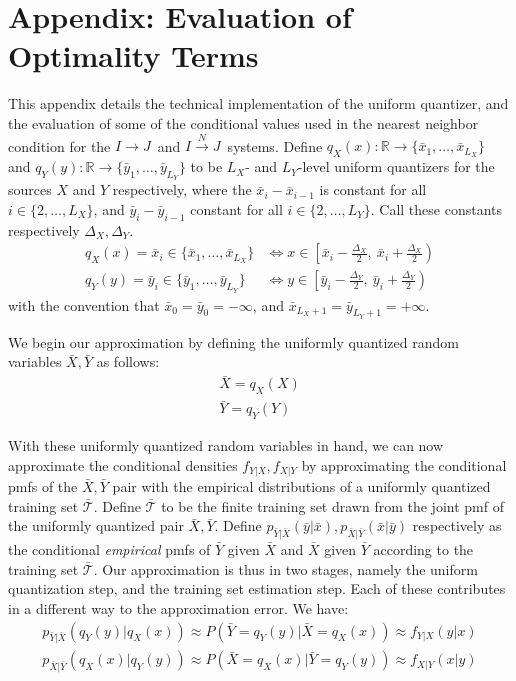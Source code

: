 \documentclass[10pt,twoside,titlepage]{article}
\newcommand{\sysIJN}{\mbox{$I \overset{N}{\rightarrow} J$}}
\newcommand{\sysIJ}{\mbox{$I \rightarrow J$}}
\begin{document}
\nocite{*}

\section{Appendix:  Evaluation of Optimality Terms}
This appendix details the technical implementation of the uniform quantizer, and the evaluation of some of the conditional values used in the nearest neighbor condition for the \sysIJ\ and \sysIJN\ systems.
Define
$q_X(x):\mathbb{R} \rightarrow \{\bar x_1,\ldots,\bar x_{L_X}\}$
and
$q_Y(y):\mathbb{R} \rightarrow \{\bar y_1,\ldots,\bar y_{L_Y}\}$
to be $L_X$- and $L_Y$-level uniform quantizers for the sources $X$ and $Y$ respectively, where the $\bar x_i-\bar x_{i-1}$ is constant for all $i\in \{2,\ldots,L_X\}$, and $\bar y_i-\bar y_{i-1}$ constant for all $i\in \{2,\ldots,L_Y\}$. Call these constants respectively $\Delta_X, \Delta_Y$.
\begin{align}
    q_X(x) = \bar x_i \in \{\bar x_1,\ldots,\bar x_{L_X}\} &\iff x \in  \left[\bar x_{i}-\frac{\Delta_X}{2},\ \bar x_i+\frac{\Delta_X}{2}\right)\\
    q_Y(y) = \bar y_i \in \{\bar y_1,\ldots,\bar y_{L_Y}\} &\iff y \in  \left[\bar y_{i}-\frac{\Delta_Y}{2},\ \bar y_i+\frac{\Delta_Y}{2}\right)
\end{align}
with the convention that $\bar x_{0}=\bar y_{0}=-\infty$, and $\bar x_{L_X+1}=\bar y_{L_Y+1}=+\infty$.

We begin our approximation by defining the uniformly quantized random variables $\bar X, \bar Y$ as follows:
\begin{align}
    \bar X = q_X(X)\\
    \bar Y = q_Y(Y)
\end{align}

With these uniformly quantized random variables in hand, we can now approximate the conditional densities $f_{Y|X}, f_{X|Y}$ by approximating the conditional pmfs of the $\bar X, \bar Y$ pair with the empirical distributions of a uniformly quantized training set $\mathcal{\bar T}$. Define $\mathcal{\bar T}$ to be the finite training set drawn from the joint pmf of the uniformly quantized pair $\bar X, \bar Y$. Define $p_{\bar Y|\bar X}(\bar y|\bar x),p_{\bar X|\bar Y}(\bar x|\bar y)$ respectively as the conditional \emph{empirical} pmfs of $\bar Y$ given $\bar X$ and $\bar X$ given $\bar Y$ according to the training set $\mathcal{\bar T}$. Our approximation is thus in two stages, namely the uniform quantization step, and the training set estimation step. Each of these contributes in a different way to the approximation error. We have:
\begin{align}
    p_{\bar Y|\bar X}(q_Y(y)|q_X(x)) \approx 
        P(\bar Y=q_Y(y) | \bar X=q_X(x)) \approx
            f_{Y|X}(y|x)\\
    p_{\bar X|\bar Y}(q_X(x)|q_Y(y)) \approx 
        P(\bar X=q_X(x) | \bar Y=q_Y(y)) \approx
            f_{X|Y}(x|y)
\end{align}
\end{document}

